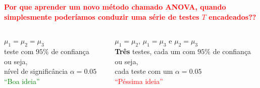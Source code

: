 \documentclass{bredelebeamer}
\begin{document}
\begin{frame}
\centering\textbf{\textcolor{red}{Por que aprender um novo método chamado
    ANOVA, quando simplesmente poderíamos conduzir uma série de testes 
    $T$ encadeados??}} 

\vspace{.6cm}

\pause
\begin{columns}
\begin{column}{.5\textwidth}
\begin{center}
\boitejaune{
\centering\textbf{\textcolor{Green}{ANOVA}}
}
\vspace{.5cm}
$\mu_{1} = \mu_{2} = \mu_{3}$ \\
\vspace{.5cm}
\small{\textbf{} teste com $95\%$ de confiança \\
\vspace{.2cm}
ou seja, \\
\vspace{.2cm}
nível de significância $\alpha = 0.05$ \\
\vspace{.3cm}
}
\vspace{.3cm}
\centering\textcolor{Green}{``Boa ideia''}
\end{center}
\end{column}

\vline

\begin{column}{.5\textwidth}
\begin{center}
\boitegreen{
\centering\textbf{\textcolor{Framajaunelight}{Teste $T$}}
}
\vspace{.5cm}
$\mu_{1} = \mu_{2}$, $\mu_{1} = \mu_{3}$ e $\mu_{2} = \mu_{3}$ \\
\vspace{.5cm}
\small{\textbf{\alert{Três}} testes, cada um com $95\%$ de confiança \\
\vspace{.2cm}
ou seja, \\
\vspace{.2cm}
cada teste com um $\alpha = 0.05$ \\
\vspace{.3cm}
}
\vspace{.3cm}
\centering\textcolor{Red}{``Péssima ideia''}
\end{center}
\end{column}
\end{columns}
\end{frame}
\end{document}
